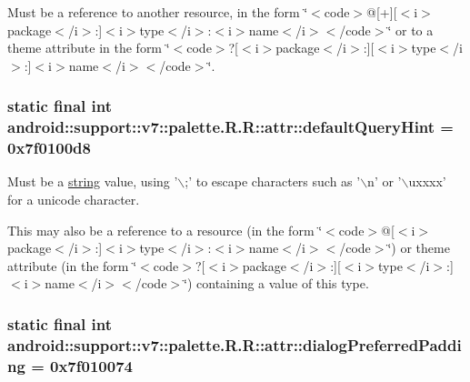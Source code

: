 Must be a reference to another resource, in the form \char`\"{}$<$code$>$@\mbox{[}+\mbox{]}\mbox{[}$<$i$>$package$<$/i$>$:\mbox{]}$<$i$>$type$<$/i$>$:$<$i$>$name$<$/i$>$$<$/code$>$\char`\"{} or to a theme attribute in the form \char`\"{}$<$code$>$?\mbox{[}$<$i$>$package$<$/i$>$:\mbox{]}\mbox{[}$<$i$>$type$<$/i$>$:\mbox{]}$<$i$>$name$<$/i$>$$<$/code$>$\char`\"{}. \hypertarget{classandroid_1_1support_1_1v7_1_1palette_1_1_r_1_1attr_77939e64cd357a1b760095c38cf822ef}{
\subsubsection[{defaultQueryHint}]{\setlength{\rightskip}{0pt plus 5cm}static final int android::support::v7::palette.R.R::attr::defaultQueryHint = 0x7f0100d8}}
\label{classandroid_1_1support_1_1v7_1_1palette_1_1_r_1_1attr_77939e64cd357a1b760095c38cf822ef}


Must be a \hyperlink{classandroid_1_1support_1_1v7_1_1palette_1_1_r_1_1string}{string} value, using '$\backslash$;' to escape characters such as '$\backslash$n' or '$\backslash$uxxxx' for a unicode character. 

This may also be a reference to a resource (in the form \char`\"{}$<$code$>$@\mbox{[}$<$i$>$package$<$/i$>$:\mbox{]}$<$i$>$type$<$/i$>$:$<$i$>$name$<$/i$>$$<$/code$>$\char`\"{}) or theme attribute (in the form \char`\"{}$<$code$>$?\mbox{[}$<$i$>$package$<$/i$>$:\mbox{]}\mbox{[}$<$i$>$type$<$/i$>$:\mbox{]}$<$i$>$name$<$/i$>$$<$/code$>$\char`\"{}) containing a value of this type. \hypertarget{classandroid_1_1support_1_1v7_1_1palette_1_1_r_1_1attr_c4dddbb2a75a290b41d57a20e74c7c72}{
\subsubsection[{dialogPreferredPadding}]{\setlength{\rightskip}{0pt plus 5cm}static final int android::support::v7::palette.R.R::attr::dialogPreferredPadding = 0x7f010074}}
\label{classandroid_1_1support_1_1v7_1_1palette_1_1_r_1_1attr_c4dddbb2a75a290b41d57a20e74c7c72}


